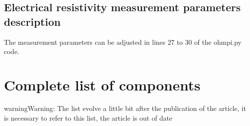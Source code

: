\documentclass[letterpaper,10pt,english]{sphinxmanual}
\begin{document}
\subsection{Electrical resistivity measurement parameters description}
\label{\detokenize{V1_01:electrical-resistivity-measurement-parameters-description}}
\begin{sphinxVerbatim}[commandchars=\\\{\},numbers=left,firstnumber=27,stepnumber=1]
    
    
   
   
   
\end{sphinxVerbatim}

\sphinxAtStartPar
The measurement parameters can be adjusted in lines 27 to 30 of the ohmpi.py code.


\section{Complete list of components}
\label{\detokenize{V1_01:complete-list-of-components}}
\begin{sphinxadmonition}{warning}{Warning:}
\sphinxAtStartPar
The list evolve a little bit after the publication of the article, it is necessary to refer to this list, the article is out of date
\end{sphinxadmonition}
\end{document}
